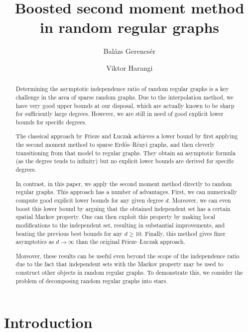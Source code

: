 \documentclass[12pt]{amsart}
\title[Boosted second moment method]
{Boosted second moment method\\in random regular graphs}
\author{Bal\'azs Gerencs\'er}
\author{Viktor Harangi}
\theoremstyle{definition}
\begin{document}
\begin{abstract}
Determining the asymptotic independence ratio of random regular graphs is a key challenge in the area of sparse random graphs. Due to the interpolation method, we have very good upper bounds at our disposal, which are actually known to be sharp for sufficiently large degrees. However, we are still in need of good explicit lower bounds for specific degrees.

The classical approach by Frieze and {\L}uczak achieves a lower bound by first applying the second moment method to sparse Erd\H{o}s--R\'enyi graphs, and then cleverly transitioning from that model to regular graphs. They obtain an asymptotic formula (as the degree tends to infinity) but no explicit lower bounds are derived for specific degrees.

In contrast, in this paper, we apply the second moment method directly to random regular graphs. This approach has a number of advantages. First, we can numerically compute good explicit lower bounds for any given degree $d$. Moreover, we can even boost this lower bound by arguing that the obtained independent set has a certain spatial Markov property. One can then exploit this property by making local modifications to the independent set, resulting in substantial improvements, and beating the previous best bounds for any $d \geq 10$. Finally, this method gives finer asymptotics as $d \to \infty$ than the original Frieze--{\L}uczak approach. 

Moreover, these results can be useful even beyond the scope of the independence ratio due to the fact that independent sets with the Markov property may be used to construct other objects in random regular graphs. To demonstrate this, we consider the problem of decomposing random regular graphs into stars.
\end{abstract}


\maketitle

\section{Introduction} \label{sec:intro}
\end{document}
